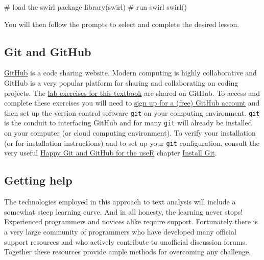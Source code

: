 \documentclass[
  letterpaper,
]{latex/krantz}
\newenvironment{Shaded}{\begin{snugshade}}{\end{snugshade}}
\newcommand{\CommentTok}[1]{\textcolor[rgb]{0.37,0.37,0.37}{#1}}
\newcommand{\FunctionTok}[1]{\textcolor[rgb]{0.28,0.35,0.67}{#1}}
\newcommand{\NormalTok}[1]{\textcolor[rgb]{0.00,0.23,0.31}{#1}}
\begin{document}
\begin{Shaded}
\begin{Highlighting}[]
\CommentTok{\# load the swirl package}
\FunctionTok{library}\NormalTok{(swirl) }
\CommentTok{\# run swirl}
\FunctionTok{swirl}\NormalTok{()}
\end{Highlighting}
\end{Shaded}

You will then follow the prompts to select and complete the desired
lesson.

\hypertarget{git-and-github}{%
\subsection*{Git and GitHub}\label{git-and-github}}

\href{https://github.com/}{GitHub} is a code sharing website. Modern
computing is highly collaborative and GitHub is a very popular platform
for sharing and collaborating on coding projects. The
\href{https://github.com/stars/francojc/lists/labs}{lab exercises for
this textbook} are shared on GitHub. To access and complete these
exercises you will need to
\href{https://github.com/signup?ref_cta=Sign+up\&ref_loc=header+logged+out\&ref_page=\%2F\&source=header-home}{sign
up for a (free) GitHub account} and then set up the version control
software \texttt{git} on your computing environment. \texttt{git} is the
conduit to interfacing GitHub and for many \texttt{git} will already be
installed on your computer (or cloud computing environment). To verify
your installation (or for installation instructions) and to set up your
\texttt{git} configuration, consult the very useful
\href{https://happygitwithr.com/}{Happy Git and GitHub for the useR}
chapter \href{https://happygitwithr.com/install-git.html}{Install Git}.

\hypertarget{getting-help}{%
\subsection*{Getting help}\label{getting-help}}

The technologies employed in this approach to text analysis will include
a somewhat steep learning curve. And in all honesty, the learning never
stops! Experienced programmers and novices alike require support.
Fortunately there is a very large community of programmers who have
developed many official support resources and who actively contribute to
unofficial discussion forums. Together these resources provide ample
methods for overcoming any challenge.
\end{document}

